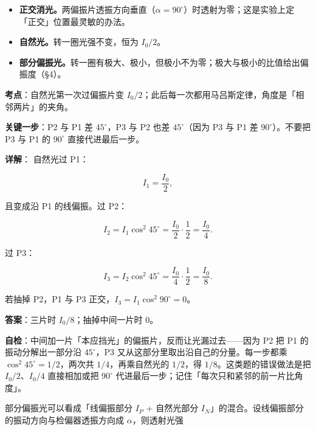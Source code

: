 \documentclass[11pt]{ctexart}
\begin{document}

\begin{itemize}
\item \textbf{正交消光。}两偏振片透振方向垂直（$\alpha=90^\circ$）时透射为零；这是实验上定「正交」位置最灵敏的办法。
\item \textbf{自然光。}转一圈光强不变，恒为 $I_0/2$。
\item \textbf{部分偏振光。}转一圈有极大、极小，但极小不为零；极大与极小的比值给出偏振度（§4）。
\end{itemize}


\qbreak
{}

\textbf{考点}：自然光第一次过偏振片变 $I_0/2$；此后每一次都用马吕斯定律，角度是「相邻两片」的夹角。

\textbf{关键一步}：P2 与 P1 差 $45^\circ$，P3 与 P2 也差 $45^\circ$（因为 P3 与 P1 差 $90^\circ$）。不要把 P3 与 P1 的 $90^\circ$ 直接代进最后一步。

\textbf{详解}：
自然光过 P1：

\[
I_1=\frac{I_0}{2},
\]

且变成沿 P1 的线偏振。过 P2：

\[
I_2=I_1\cos^2 45^\circ=\frac{I_0}{2}\cdot\frac12=\frac{I_0}{4}.
\]

过 P3：

\[
I_3=I_2\cos^2 45^\circ=\frac{I_0}{4}\cdot\frac12=\frac{I_0}{8}.
\]

若抽掉 P2，P1 与 P3 正交，$I_3=I_1\cos^2 90^\circ=0$。

\textbf{答案}：三片时 $I_0/8$；抽掉中间一片时 $0$。

\textbf{自检}：中间加一片「本应挡光」的偏振片，反而让光漏过去——因为 P2 把 P1 的振动分解出一部分沿 $45^\circ$，P3 又从这部分里取出沿自己的分量。每一步都乘 $\cos^2 45^\circ=1/2$，两次共 $1/4$，再乘自然光的 $1/2$，得 $1/8$。这类题的错误做法是把 $I_0/2$、$I_0/4$ 直接相加或把 $90^\circ$ 代进最后一步；记住「每次只和紧邻的前一片比角度」。



部分偏振光可以看成「线偏振部分 $I_P$ + 自然光部分 $I_N$」的混合。设线偏振部分的振动方向与检偏器透振方向成 $\alpha$，则透射光强
\end{document}
